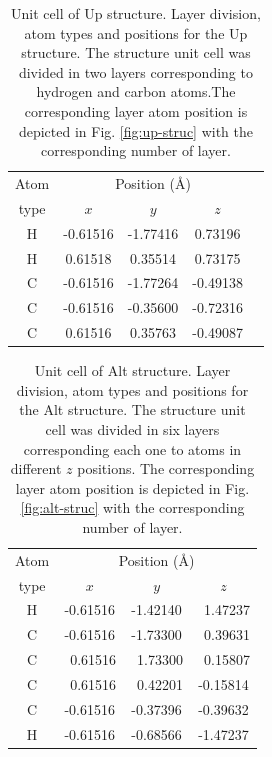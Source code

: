 \documentclass[floatfix,prb,aps,superscriptaddress,showpacs,11pt,preprint,letterpaper]{revtex4}
\begin{document}
\begin{table}[t]
\center
\begin{tabular}{ccccc}\\
\hline
\quad Atom \qquad & \multicolumn{3}{c}{Position (\AA)} \\
\cline{2-4}
\quad type \qquad & $x$ & $y$ & $z$  \\
\hline
H & -0.61516 & -1.77416 &  0.73196 \\
H &  0.61518 &  0.35514 &  0.73175 \\
C & -0.61516 & -1.77264 & -0.49138 \\
C & -0.61516 & -0.35600 & -0.72316 \\
C &  0.61516 &  0.35763 & -0.49087 \\
\hline
\end{tabular}

\caption{Unit cell of Up structure. Layer division, atom types and
positions for the Up structure. The structure unit cell was divided in
two layers corresponding to hydrogen and carbon atoms.The corresponding layer
atom position is depicted in Fig. \ref{fig:up-struc} with the corresponding
number of layer.}
\label{tab:up-unitcell}
\end{table}
% 
% 
\begin{table}[t]
\center
\begin{tabular}{cccc}\\
\hline
\quad Atom \qquad & \multicolumn{3}{c}{Position (\AA)} \\
\cline{2-4}
\quad type \qquad & $x$ & $y$ & $z$  \\
\hline
H &  -0.61516 &  -1.42140 & \ 1.47237 \\
C &  -0.61516 &  -1.73300 & \ 0.39631 \\
C & \ 0.61516 & \ 1.73300 & \ 0.15807 \\
C & \ 0.61516 & \ 0.42201 &  -0.15814 \\
C &  -0.61516 &  -0.37396 &  -0.39632 \\
H &  -0.61516 &  -0.68566 &  -1.47237 \\
\hline
\end{tabular}

\caption{Unit cell of Alt structure. Layer division, atom types and
positions for the Alt structure. The structure unit cell was divided in
six layers corresponding each one to atoms in different $z$ positions. The
corresponding layer atom position is depicted in Fig. \ref{fig:alt-struc} with
the corresponding number of layer.}
\label{tab:alt-unitcell}
\end{table}
\end{document}
